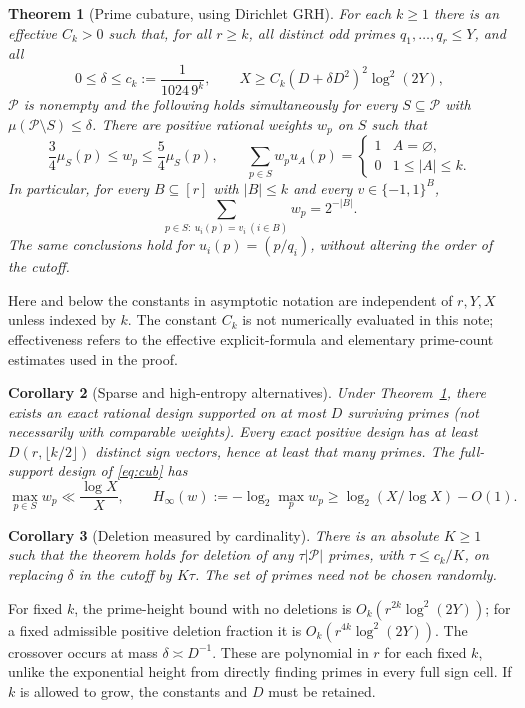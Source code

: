 \documentclass[11pt]{article}
\newtheorem{theorem}{Theorem}[section]
\newtheorem{corollary}[theorem]{Corollary}
\theoremstyle{remark}\newtheorem{remark}[theorem]{Remark}
\newcommand{\Pp}{\mathcal P}
\newcommand{\abs}[1]{\left|#1\right|}
\begin{document}
\begin{theorem}[Prime cubature, using Dirichlet GRH]\label{thm:main}
For each $k\ge1$ there is an effective $C_k>0$ such that, for all $r\ge k$, all distinct odd primes $q_1,\dots,q_r\le Y$, and all
\[
 0\le\delta\le c_k:=\frac{1}{1024\,9^k},\qquad
 X\ge C_k(D+\delta D^2)^2\log^2(2Y),
\]
$\Pp$ is nonempty and the following holds simultaneously for every $S\subseteq\Pp$ with $\mu(\Pp\setminus S)\le\delta$. There are positive rational weights $w_p$ on $S$ such that
\begin{equation}\label{eq:cub}
 \frac34\mu_S(p)\le w_p\le\frac54\mu_S(p),\qquad
 \sum_{p\in S}w_p u_A(p)=\begin{cases}1&A=\varnothing,\\0&1\le |A|\le k.\end{cases}
\end{equation}
In particular, for every $B\subseteq[r]$ with $|B|\le k$ and every $v\in\{-1,1\}^B$,
\begin{equation}\label{eq:indep}
 \sum_{p\in S:\ u_i(p)=v_i\ (i\in B)}w_p=2^{-|B|}.
\end{equation}
The same conclusions hold for $u_i(p)=(p/q_i)$, without altering the order of the cutoff.
\end{theorem}
Here and below the constants in asymptotic notation are independent of $r,Y,X$ unless indexed by $k$. The constant $C_k$ is not numerically evaluated in this note; effectiveness refers to the effective explicit-formula and elementary prime-count estimates used in the proof.

\begin{corollary}[Sparse and high-entropy alternatives]\label{cor:sparse}
Under Theorem~\ref{thm:main}, there exists an exact rational design supported on at most $D$ surviving primes (not necessarily with comparable weights). Every exact positive design has at least $D(r,\lfloor k/2\rfloor)$ distinct sign vectors, hence at least that many primes. The full-support design of \eqref{eq:cub} has
\[
 \max_{p\in S}w_p\ll \frac{\log X}{X},\qquad
 H_\infty(w):=-\log_2\max_p w_p\ge \log_2(X/\log X)-O(1).
\]
\end{corollary}
\begin{corollary}[Deletion measured by cardinality]\label{cor:count}
There is an absolute $K\ge1$ such that the theorem holds for deletion of any $\tau\abs{\Pp}$ primes, with $\tau\le c_k/K$, on replacing $\delta$ in the cutoff by $K\tau$. The set of primes need not be chosen randomly.
\end{corollary}
For fixed $k$, the prime-height bound with no deletions is $O_k(r^{2k}\log^2(2Y))$; for a fixed admissible positive deletion fraction it is $O_k(r^{4k}\log^2(2Y))$. The crossover occurs at mass $\delta\asymp D^{-1}$. These are polynomial in $r$ for each fixed $k$, unlike the exponential height from directly finding primes in every full sign cell. If $k$ is allowed to grow, the constants and $D$ must be retained.
\end{document}
